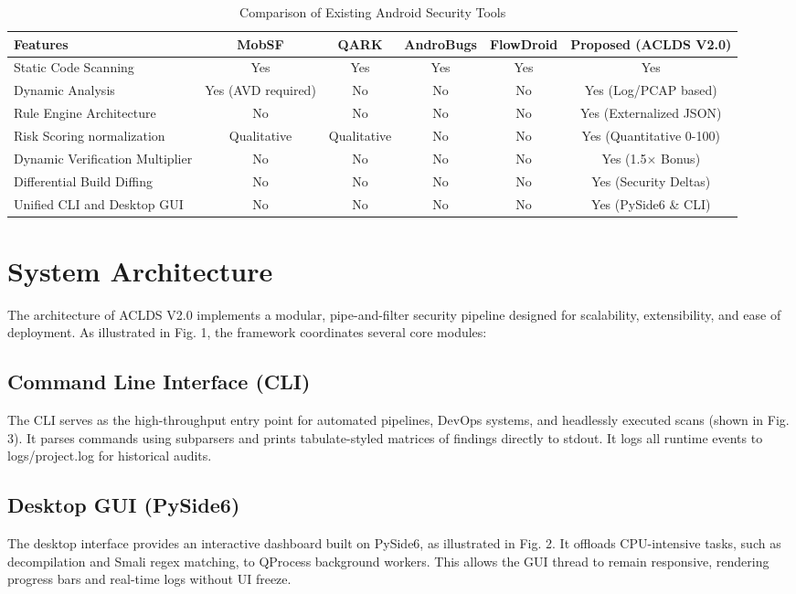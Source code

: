 \documentclass[conference]{
IEEEtran}
\begin{document}
\begin{table}[t]
\caption{Comparison of Existing Android Security Tools}
\centering
\begin{tabular}{lccccc}
\toprule
\textbf{Features} & \textbf{MobSF} & \textbf{QARK} & \textbf{AndroBugs} & \textbf{FlowDroid} & \textbf{Proposed (ACLDS V2.0)} \\
\midrule
Static Code Scanning & Yes & Yes & Yes & Yes & Yes \\
Dynamic Analysis & Yes (AVD required) & No & No & No & Yes (Log/PCAP based) \\
Rule Engine Architecture & No & No & No & No & Yes (Externalized JSON) \\
Risk Scoring normalization & Qualitative & Qualitative & No & No & Yes (Quantitative 0-100) \\
Dynamic Verification Multiplier & No & No & No & No & Yes (1.5$\times$ Bonus) \\
Differential Build Diffing & No & No & No & No & Yes (Security Deltas) \\
Unified CLI and Desktop GUI & No & No & No & No & Yes (PySide6 \& CLI) \\
\bottomrule
\end{tabular}
\end{table}

\section{System Architecture}
The architecture of ACLDS V2.0 implements a modular, pipe-and-filter security pipeline designed for scalability, extensibility, and ease of deployment. As illustrated in Fig. 1, the framework coordinates several core modules:

\subsection{Command Line Interface (CLI)}
The CLI serves as the high-throughput entry point for automated pipelines, DevOps systems, and headlessly executed scans (shown in Fig. 3). It parses commands using subparsers and prints tabulate-styled matrices of findings directly to stdout. It logs all runtime events to logs/project.log for historical audits.

\subsection{Desktop GUI (PySide6)}
The desktop interface provides an interactive dashboard built on PySide6, as illustrated in Fig. 2. It offloads CPU-intensive tasks, such as decompilation and Smali regex matching, to QProcess background workers. This allows the GUI thread to remain responsive, rendering progress bars and real-time logs without UI freeze.
\end{document}
